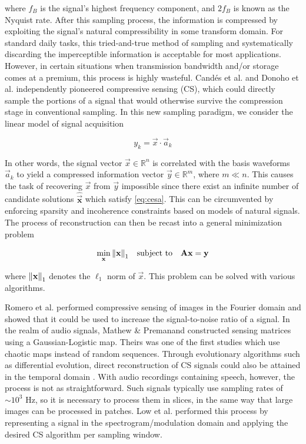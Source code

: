 \documentclass[10pt,a4paper,twoside]{article}
\begin{document}
\noindent where $f_B$ is the signal's highest frequency component, and $2f_B$ is known as the Nyquist rate. After this sampling process, the information is compressed by exploiting the signal's natural compressibility in some transform domain. For standard daily tasks, this tried-and-true method of sampling and systematically discarding the imperceptible information is acceptable for most applications. However, in certain situations when transmission bandwidth and/or storage comes at a premium, this process is highly wasteful. Cand\'{e}s et al. \cite{Candes2006} and Donoho et al. \cite{Donoho2006} independently pioneered compressive sensing (CS), which could directly sample the portions of a signal that would otherwise survive the compression stage in conventional sampling. In this new sampling paradigm, we consider the linear model of signal acquisition

\begin{equation}\label{eq:cesa}
	y_k = \vec{x} \cdot \vec{a}_k
\end{equation}

In other words, the signal vector $\vec{x} \in \mathbb{R}^n$ is correlated with the basis waveforms $\vec{a}_k$ to yield a compressed information vector $\vec{y} \in \mathbb{R}^m$, where $m \ll n$. This causes the task of recovering $\vec{x}$ from $\vec{y}$ impossible since there exist an infinite number of candidate solutions $\bm\hat{\vec{x}}$ which satisfy \eqref{eq:cesa}. This can be circumvented by enforcing sparsity and incoherence constraints \cite{Candes2008b} based on models of natural signals. The process of reconstruction can then be recast into a general minimization problem

\begin{equation}\label{eq:minl1}
	\min_{\text{\bfseries x}} \norm{\text{\bfseries x}}_1 \quad \textrm{subject to} \quad \text{\bfseries A}\text{\bfseries x} = \text{\bfseries y}
\end{equation}

\noindent where $\norm{\text{\bfseries x}}_1$ denotes the $\ell_1$ norm of $\vec{x}$. This problem can be solved with various algorithms.

Romero et al. \cite{Romero2016} performed compressive sensing of images in the Fourier domain and showed that it could be used to increase the signal-to-noise ratio of a signal. In the realm of audio signals, Mathew \& Premanand \cite{Mathew2016} constructed sensing matrices using a Gaussian-Logistic map. Theirs was one of the first studies which use chaotic maps instead of random sequences. Through evolutionary algorithms such as differential evolution, direct reconstruction of CS signals could also be attained in the temporal domain \cite{Andras2018}. With audio recordings containing speech, however, the process is not as straightforward. Such signals typically use sampling rates of $\sim 10^{3}$ Hz, so it is necessary to process them in slices, in the same way that large images can be processed in patches. Low et al. \cite{Low2018} performed this process by representing a signal in the spectrogram/modulation domain and applying the desired CS algorithm per sampling window.
\end{document}
